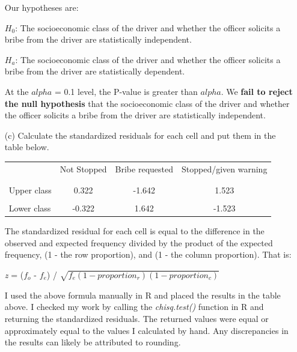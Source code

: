 \documentclass[12pt,letterpaper]{article}
\begin{document}
\begin{enumerate}
	Our hypotheses are: \vspace{0.5cm}
	
	$H_0$: The socioeconomic class of the driver and whether the officer solicits a bribe from the driver are statistically independent.
	
	$H_a$: The socioeconomic class of the driver and whether the officer solicits a bribe from the driver are statistically dependent. \vspace{0.5cm}
	
	At the $alpha$ = 0.1 level, the P-value is greater than $alpha$. We \textbf{fail to reject the null hypothesis} that the socioeconomic class of the driver and whether the officer solicits a bribe from the driver are statistically independent.
	
	\newpage
	\item [(c)] Calculate the standardized residuals for each cell and put them in the table below.
	
	\begin{table}[h]
		\centering
		\begin{tabular}{l | c c c }
			& Not Stopped & Bribe requested & Stopped/given warning \\
			\\[-1.8ex] 
			\hline \\[-1.8ex]
			Upper class  & 0.322 &  -1.642 & 1.523 \\
			\\
			Lower class & -0.322 & 1.642 & -1.523  \\
			
		\end{tabular}
	\end{table}
	
  \vspace{0.5cm}

The standardized residual for each cell is equal to the difference in the observed and expected frequency divided by the product of the expected frequency, (1 - the row proportion), and (1 - the column proportion). That is: \vspace{0.5cm}

\textit{z} = ($f_o$ - $f_e$) / $\sqrt{f_e(1 - proportion_r)(1 - proportion_c)}$ \vspace{0.5cm}

I used the above formula manually in R and placed the results in the table above. I checked my work by calling the \textit{chisq.test()} function in R and returning the standardized residuals. The returned values were equal or approximately equal to the values I calculated by hand. Any discrepancies in the results can likely be attributed to rounding. \vspace{0.5cm}


\end{enumerate}
\end{document}
